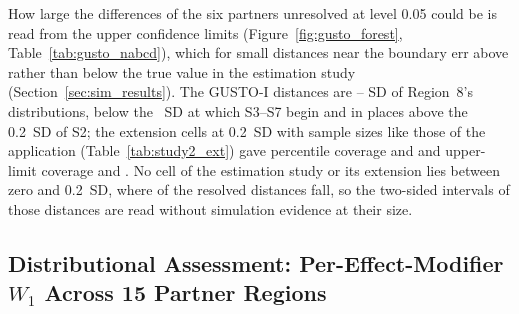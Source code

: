 \documentclass[AMA,Times1COL]{WileyNJDv5}
\begin{document}
How large the differences of the six partners unresolved at level 0.05 could be is read from the upper confidence limits (Figure~\ref{fig:gusto_forest}, Table~\ref{tab:gusto_nabcd}), which for small distances near the boundary err above rather than below the true value in the estimation study (Section~\ref{sec:sim_results}). The GUSTO-I distances are -- SD of Region~8's distributions, below the ~SD at which S3--S7 begin and in places above the 0.2~SD of S2; the extension cells at 0.2~SD with sample sizes like those of the application (Table~\ref{tab:study2_ext}) gave percentile coverage  and  and upper-limit coverage  and . No cell of the estimation study or its extension lies between zero and 0.2~SD, where  of the  resolved distances fall, so the two-sided intervals of those distances are read without simulation evidence at their size.

\subsection{Distributional Assessment: Per-Effect-Modifier $W_1$ Across 15 Partner Regions}\label{sec:app_nabcd}
\end{document}
